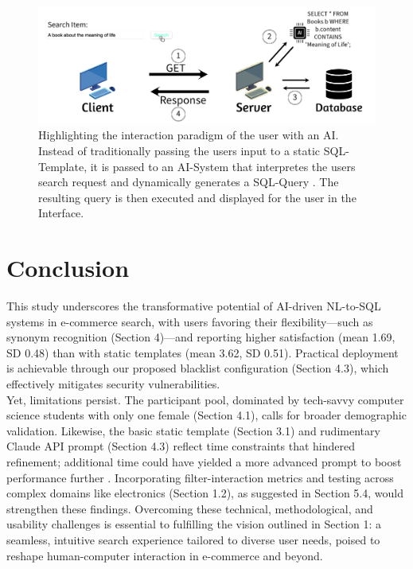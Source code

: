 \documentclass[manuscript,review]{acmart}
\begin{document}
\begin{figure}[h]
  \includegraphics[width=\textwidth]{images/front_image}
  \caption{Highlighting the interaction paradigm of the user with an AI. Instead
  of traditionally passing the users input to a static SQL-Template, it is passed 
  to an AI-System that interpretes the users search request and dynamically generates a SQL-Query
  . The resulting query is then executed and displayed for the user in the Interface.}
\end{figure}












\section{Conclusion}
This study underscores the transformative potential of AI-driven NL-to-SQL systems in e-commerce search, with 
users favoring their flexibility—such as synonym recognition (Section 4)—and reporting higher satisfaction 
(mean 1.69, SD 0.48) than with static templates (mean 3.62, SD 0.51). Practical deployment is achievable through 
our proposed blacklist configuration (Section 4.3), which effectively mitigates security vulnerabilities.\\
Yet, limitations persist. The participant pool, dominated by tech-savvy computer science students with 
only one female (Section 4.1), calls for broader demographic validation. Likewise, the basic static 
template (Section 3.1) and rudimentary Claude API prompt (Section 4.3) reflect time constraints that 
hindered refinement; additional time could have yielded a more advanced prompt to boost performance further \cite{gaoTextSQLEmpoweredLarge2023}. 
Incorporating filter-interaction metrics and testing across complex domains like electronics (Section 1.2), as 
suggested in Section 5.4, would strengthen these findings. Overcoming these technical, methodological, and 
usability challenges is essential to fulfilling the vision outlined in Section 1: a seamless, intuitive search 
experience tailored to diverse user needs, poised to reshape human-computer interaction in e-commerce and beyond.
\end{document}
